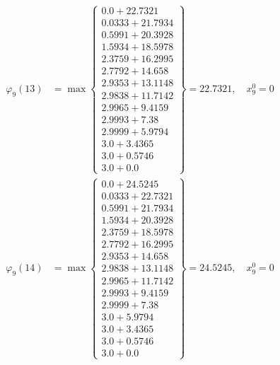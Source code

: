 \documentclass{article}
\begin{document}
\begin{align*}
  
  
  
\varphi_{9}(13) &= \max \left\{ \begin{array}{c}
0.0 + 22.7321 \\
 0.0333 + 21.7934 \\
 0.5991 + 20.3928 \\
 1.5934 + 18.5978 \\
 2.3759 + 16.2995 \\
 2.7792 + 14.658 \\
 2.9353 + 13.1148 \\
 2.9838 + 11.7142 \\
 2.9965 + 9.4159 \\
 2.9993 + 7.38 \\
 2.9999 + 5.9794 \\
 3.0 + 3.4365 \\
 3.0 + 0.5746 \\
 3.0 + 0.0
\end{array} \right\}=22.7321,\quad x_{9}^0=0\\
  
  
  
  
\varphi_{9}(14) &= \max \left\{ \begin{array}{c}
0.0 + 24.5245 \\
 0.0333 + 22.7321 \\
 0.5991 + 21.7934 \\
 1.5934 + 20.3928 \\
 2.3759 + 18.5978 \\
 2.7792 + 16.2995 \\
 2.9353 + 14.658 \\
 2.9838 + 13.1148 \\
 2.9965 + 11.7142 \\
 2.9993 + 9.4159 \\
 2.9999 + 7.38 \\
 3.0 + 5.9794 \\
 3.0 + 3.4365 \\
 3.0 + 0.5746 \\
 3.0 + 0.0
\end{array} \right\}=24.5245,\quad x_{9}^0=0\\
  
  
  

\end{align*}
\end{document}
